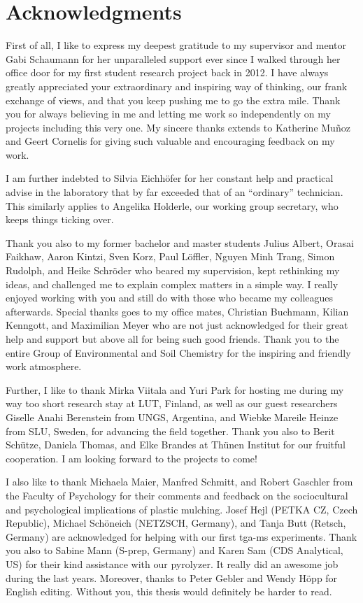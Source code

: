 
\chapter{Acknowledgments}

First of all, I like to express my deepest gratitude to my supervisor and mentor Gabi Schaumann for her unparalleled support ever since I walked through her office door for my first student research project back in 2012. I have always greatly appreciated your extraordinary and inspiring way of thinking, our frank exchange of views, and that you keep pushing me to go the extra mile. Thank you for always believing in me and letting me work so independently on my projects including this very one.
My sincere thanks extends to Katherine Muñoz and Geert Cornelis for giving such valuable and encouraging feedback on my work.

I am further indebted to Silvia Eichhöfer for her constant help and practical advise in the laboratory that by far exceeded that of an ``ordinary'' technician. This similarly applies to Angelika Holderle, our working group secretary, who keeps things ticking over.

Thank you also to my former bachelor and master students Julius Albert, Orasai Faikhaw, Aaron Kintzi, Sven Korz, Paul Löffler, Nguyen Minh Trang, Simon Rudolph, and Heike Schröder who beared my supervision, kept rethinking my ideas, and challenged me to explain complex matters in a simple way. I really enjoyed working with you and still do with those who became my colleagues afterwards.
Special thanks goes to my office mates, Christian Buchmann, Kilian Kenngott, and Maximilian Meyer who are not just acknowledged for their great help and support but above all for being such good friends. Thank you to the entire Group of Environmental and Soil Chemistry for the inspiring and friendly work atmosphere.

Further, I like to thank Mirka Viitala and Yuri Park for hosting me during my way too short research stay at LUT, Finland, as well as our guest researchers Giselle Anahi Berenstein from UNGS, Argentina, and Wiebke Mareile Heinze from SLU, Sweden, for advancing the field together. Thank you also to Berit Schütze, Daniela Thomas, and Elke Brandes at \foreignlanguage{ngerman}{Thünen Institut} for our fruitful cooperation. I am looking forward to the projects to come!

I also like to thank Michaela Maier, Manfred Schmitt, and Robert Gaschler from the Faculty of Psychology for their comments and feedback on the sociocultural and psychological implications of plastic mulching. Josef Hejl (PETKA CZ, Czech Republic), Michael Schöneich (NETZSCH, Germany), and Tanja Butt (Retsch, Germany) are acknowledged for helping with our first \acs{tga-ms} experiments. Thank you also to Sabine Mann (S-prep, Germany) and Karen Sam (CDS Analytical, US) for their kind assistance with our pyrolyzer. It really did an awesome job during the last years. Moreover, thanks to Peter Gebler and Wendy Höpp for English editing. Without you, this thesis would definitely be harder to read.

